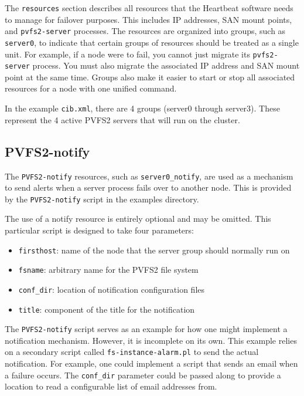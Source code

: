 \documentclass[11pt]{article}
\begin{document}
The \texttt{resources} section describes all resources that the
Heartbeat software needs to manage for failover purposes.  This includes
IP addresses, SAN mount points, and \texttt{pvfs2-server} processes.  The
resources are organized into groups, such as \texttt{server0}, to
indicate that certain groups of resources should be treated as a single
unit.  For example, if a node were to fail, you cannot just migrate its
\texttt{pvfs2-server} process.  You must also migrate the associated IP address
and SAN mount point at the same time.  Groups also make it easier to
start or stop all associated resources for a node with one unified command.

In the example \texttt{cib.xml}, there are 4 groups (server0 through
server3).  These represent the 4 active PVFS2 servers that will run on
the cluster.

\subsection{PVFS2-notify}

The \texttt{PVFS2-notify} resources, such as \texttt{server0\_notify}, are
used as a mechanism to send alerts when a server process fails over to
another node.  This is provided by the \texttt{PVFS2-notify} script in
the examples directory.

The use of a notify resource is entirely optional and may be omitted.
This particular script is designed to take four parameters:
\begin{itemize}
\item \texttt{firsthost}: name of the node that the server group should normally
run on
\item \texttt{fsname}: arbitrary name for the PVFS2 file system
\item \texttt{conf\_dir}: location of notification configuration files
\item \texttt{title}: component of the title for the notification
\end{itemize}

The \texttt{PVFS2-notify} script serves as an example for how one might
implement a notification mechanism.  However, it is incomplete on its
own.  This example relies on a secondary script called
\texttt{fs-instance-alarm.pl} to send the actual notification.  For
example, one could implement a script that sends an email when a failure
occurs.  The \texttt{conf\_dir} parameter could be passed along to
provide a location to read a configurable list of email addresses from.
\end{document}
